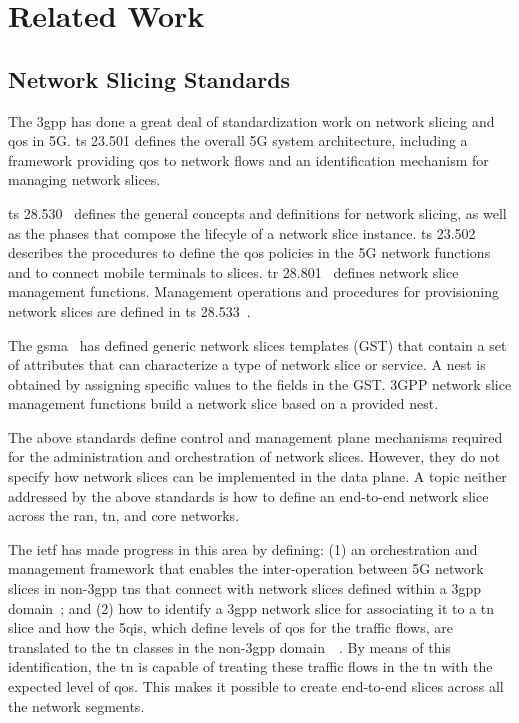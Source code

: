 \section{Related Work}
\label{sec:soa}
\subsection{Network Slicing Standards}
\label{subsec:soa-standards}
The \gls{3gpp} has done a great deal of standardization work on network slicing and \gls{qos} in 5G. \gls{ts} 23.501 \cite{3GPP2023_1} defines the overall 5G system architecture, including a framework providing \gls{qos} to network flows and an identification mechanism for managing network slices. 

\gls{ts} 28.530~\cite{3GPP2024_1} defines the general concepts and definitions for network slicing, as well as the phases that compose the lifecyle of a network slice instance. \gls{ts} 23.502~\cite{3GPP2023_2} describes the procedures to define the \gls{qos} policies in the 5G network functions and to connect mobile terminals to slices. \gls{tr} 28.801~\cite{3GPP2018} defines network slice management functions. Management operations and procedures for provisioning network slices are defined in \gls{ts} 28.533~\cite{3GPP2024_2}.

The \protect\gls{gsma}~\cite{GSMA} has defined generic network slices templates (GST) that contain a set of attributes that can characterize a type of network slice or service. A \gls{nest} is obtained by assigning specific values to the fields in the GST. 3GPP network slice management functions build a network slice based on a provided \gls{nest}.

The above standards define control and management plane mechanisms required for the administration and orchestration of network slices. However, they do not specify how network slices can be implemented in the data plane. A topic neither addressed by the above standards is how to define an end-to-end network slice across the \gls{ran}, \gls{tn}, and core networks. 

The \gls{ietf} has made progress in this area by defining: (1) an orchestration and management framework that enables the inter-operation between 5G network slices in non-\gls{3gpp} \glspl{tn} that connect with network slices defined within a \gls{3gpp} domain~\cite{draft-ietf-teas-5g-network-slice-application}; and (2) how to identify a \gls{3gpp} network slice for associating it to a \gls{tn} slice and how the \glspl{5qi}, which define levels of \gls{qos} for the traffic flows, are translated to the \gls{tn} classes in the non-\gls{3gpp} domain~\cite{draft-ietf-teas-5g-ns-ip-mpls}~\cite{draft-cbs-teas-5qi-to-dscp-mapping}. By means of this identification, the \gls{tn} is capable of treating these traffic flows in the \gls{tn} with the expected level of \gls{qos}. This makes it possible to create end-to-end slices across all the network segments. 



